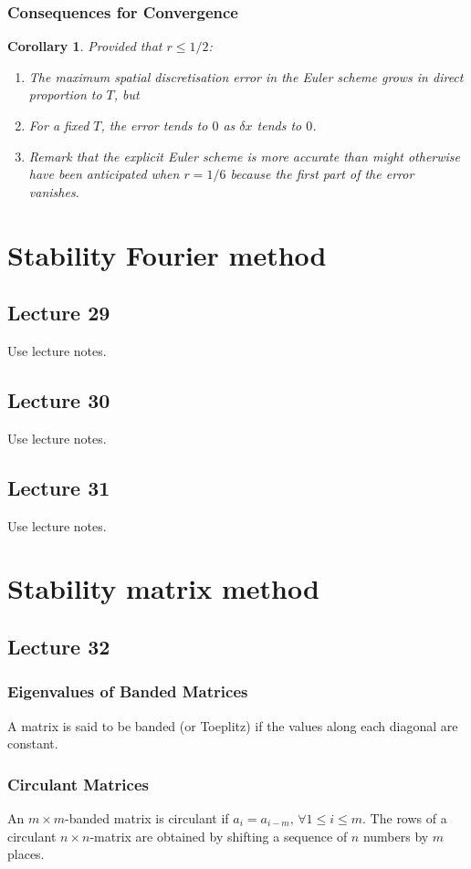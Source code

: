 \documentclass{article}
\newtheorem{corollary}{Corollary}
\begin{document}
\subsubsection{Consequences for Convergence}
\begin{corollary}
    Provided that $r\leq 1/2$:
    \begin{enumerate}
        \item The maximum spatial discretisation error in the Euler scheme grows in direct proportion to $T$, but
        \item For a fixed $T$, the error tends to $0$ as $\delta x$ tends to $0$.
        \item Remark that the explicit Euler scheme is more accurate than might otherwise have been anticipated when $r=1/6$ because the first part of the error vanishes.
    \end{enumerate}
\end{corollary}


\section{Stability Fourier method}
\subsection{Lecture 29}
Use lecture notes.
\subsection{Lecture 30}
Use lecture notes.
\subsection{Lecture 31}
Use lecture notes.


\section{Stability matrix method}
\subsection{Lecture 32}
\subsubsection{Eigenvalues of Banded Matrices}
A matrix is said to be banded (or Toeplitz) if the values along each diagonal are constant. 

\subsubsection{Circulant Matrices}
An $m\times m$-banded matrix is circulant if $a_i = a_{i-m},\,\forall 1\leq i \leq m$. The rows of a circulant $n \times n$-matrix are obtained by shifting a sequence of $n$ numbers by $m$ places.
\end{document}
